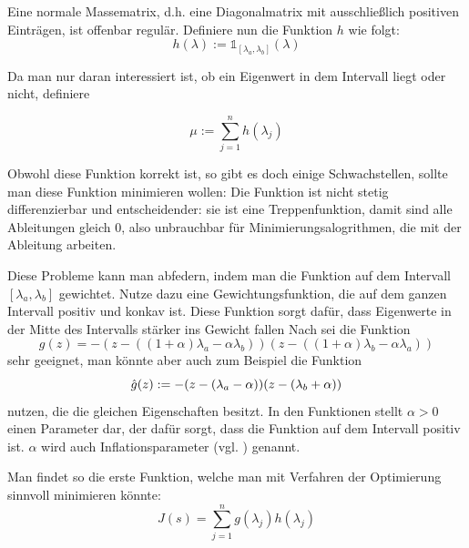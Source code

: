 \documentclass[a4paper,12pt]{report}
\newcommand{\zitat}[1]{\glqq #1\grqq}
\newcommand{\1}{\mathds{1}}
\theoremstyle{plain} %
\theoremstyle{definition} %
\theoremstyle{remark}
\begin{document}
            Eine normale Massematrix, d.h. eine Diagonalmatrix mit ausschließlich positiven Einträgen, ist offenbar regulär.
            Definiere nun die Funktion $h$ wie folgt:
            $$h(\lambda):=\1_{[\lambda_a,\lambda_b]}(\lambda)$$

            Da man nur daran interessiert ist, ob ein Eigenwert in dem Intervall liegt oder nicht, definiere

            $$\mu := \sum_{j=1}^{n} h(\lambda_j)$$

            Obwohl diese Funktion korrekt ist, so gibt es doch einige Schwachstellen, sollte man diese Funktion minimieren wollen:
            Die Funktion ist nicht stetig differenzierbar und entscheidender: sie ist eine Treppenfunktion, damit sind alle Ableitungen gleich 0, also unbrauchbar für Minimierungsalogrithmen, die mit der Ableitung arbeiten.

            Diese Probleme kann man abfedern, indem man die Funktion auf dem Intervall $[\lambda_a, \lambda_b]$ gewichtet.
            Nutze dazu eine Gewichtungsfunktion, die auf dem ganzen Intervall positiv und konkav ist.
            Diese Funktion sorgt dafür, dass Eigenwerte in der Mitte des Intervalls stärker ins Gewicht fallen
            Nach \cite[S. 3]{hauptteilTkachuk} sei die Funktion
            $$g(z) = -(z-((1+\alpha)\lambda_a -\alpha\lambda_b))(z-((1+\alpha)\lambda_b-\alpha\lambda_a))$$
            sehr geeignet, man könnte aber auch zum Beispiel die Funktion
            $$\Hat g(z) := -(z-(\lambda_a-\alpha))(z-(\lambda_b+\alpha))$$
            nutzen, die die gleichen Eigenschaften besitzt.
            In den Funktionen stellt $\alpha>0$ einen Parameter dar, der dafür sorgt, dass die Funktion auf dem Intervall positiv ist.
            $\alpha$ wird auch \zitat{Inflationsparameter} (vgl. \cite[S. 3]{hauptteilTkachuk}) genannt.

            Man findet so die erste Funktion, welche man mit Verfahren der Optimierung sinnvoll minimieren könnte:
            $$J(s) = \sum_{j=1}^n g(\lambda_j)h(\lambda_j)$$
\end{document}
